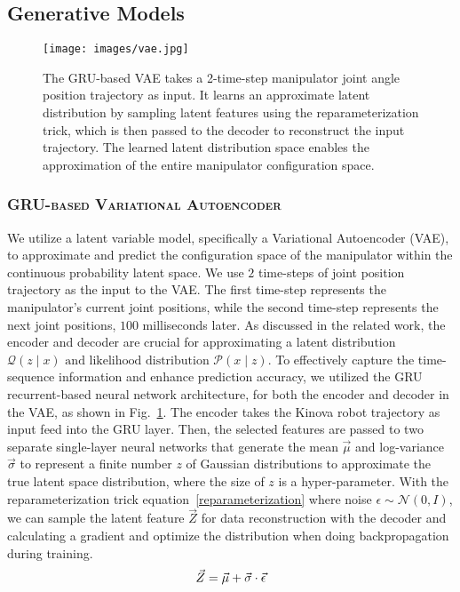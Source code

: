 \subsection{Generative Models}
 \begin{figure}[t]
    \centering
    \texttt{[image: images/vae.jpg]}
    \captionsetup{font=footnotesize}
    \caption{The GRU-based VAE takes a 2-time-step manipulator joint angle position trajectory as input. It learns an approximate latent distribution by sampling latent features using the reparameterization trick, which is then passed to the decoder to reconstruct the input trajectory. The learned latent distribution space enables the approximation of the entire manipulator configuration space.}
    \label{fig:vae}
    \vspace{-20pt}
\end{figure}
\vspace{-2.2mm}

\subsubsection{\textbf{\textsc{GRU-based Variational Autoencoder}}} We utilize a latent variable model, specifically a Variational Autoencoder (VAE), to approximate and predict the configuration space of the manipulator within the continuous probability latent space. We use $2$ time-steps of joint position trajectory as the input to the VAE. The first time-step represents the manipulator's current joint positions, while the second time-step represents the next joint positions, $100$ milliseconds later. As discussed in the related work, the encoder and decoder are crucial for approximating a latent distribution $\mathcal{Q}({z}\mid{x})\text{ and likelihood distribution }\mathcal{P}({x}\mid{z})$.
 To effectively capture the time-sequence information and enhance prediction accuracy, we utilized the GRU recurrent-based neural network architecture, for both the encoder and decoder in the VAE, as shown in Fig.~\ref{fig:vae}. The encoder takes the Kinova robot trajectory as input feed into the GRU layer. Then, the selected features are passed to two separate single-layer neural networks that generate the mean $\vec{\mu}$ and log-variance $\vec{\sigma}$ to represent a finite number $z$ of Gaussian distributions to approximate the true latent space distribution, where the size of $z$ is a hyper-parameter. With the reparameterization trick equation~\ref{reparameterization} where noise \( \epsilon \sim \mathcal{N}(0, I) \), we can sample the latent feature $\vec{Z}$ for data reconstruction with the decoder and calculating a gradient and optimize the distribution when doing backpropagation during training. 
\vspace{-1.9mm} 
 \begin{equation}\label{reparameterization}
\vec{Z} = \vec{\mu} + \vec{\sigma} \cdot \vec{\epsilon}
\vspace{-15pt}
\end{equation}
\vspace{-1.9mm} 

